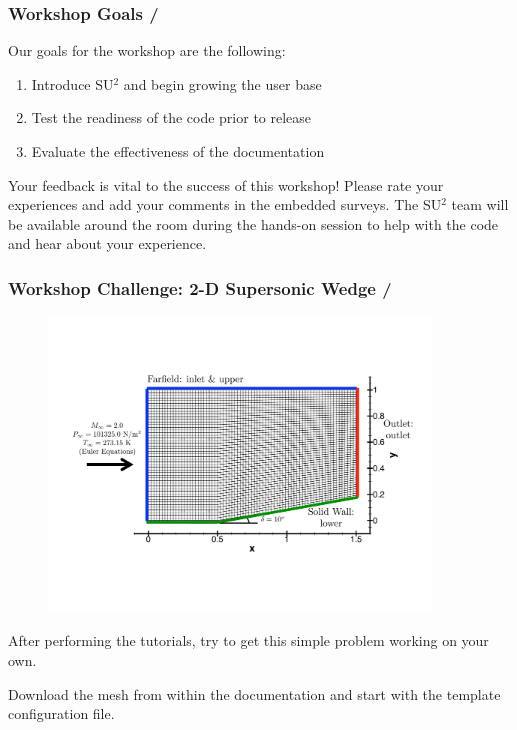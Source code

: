 \documentclass[handout,table]{beamer}
\begin{document}
\begin{frame}[t]
\frametitle{Workshop Goals \hfill  \small{ \insertframenumber/\inserttotalframenumber} }

\vspace{0.3in}
Our goals for the workshop are the following:

\begin{enumerate}
\item Introduce SU$^2$ and begin growing the user base 
\item Test the readiness of the code prior to release
\item Evaluate the effectiveness of the documentation
\end{enumerate}

\vspace{0.3in}

 Your feedback is vital to the success of this workshop! Please rate your experiences and add your comments in the embedded surveys. The SU$^2$ team will be available around the room during the hands-on session to help with the code and hear about your experience.

\end{frame}


\begin{frame}[t]
\frametitle{Workshop Challenge: 2-D Supersonic Wedge \hfill  \small{ \insertframenumber/\inserttotalframenumber} }

\vspace{-0.2in}

\begin{figure}
\begin{center}
\includegraphics[width=4.0in]{mesh&bcs.pdf}
\label{wedge_mesh}
\end{center}
\end{figure}

\vspace{-0.25in}
\center
{\tiny After performing the tutorials, try to get this simple problem working on your own.

Download the mesh from within the documentation and start with the template configuration file. }

\end{frame}
\end{document}
